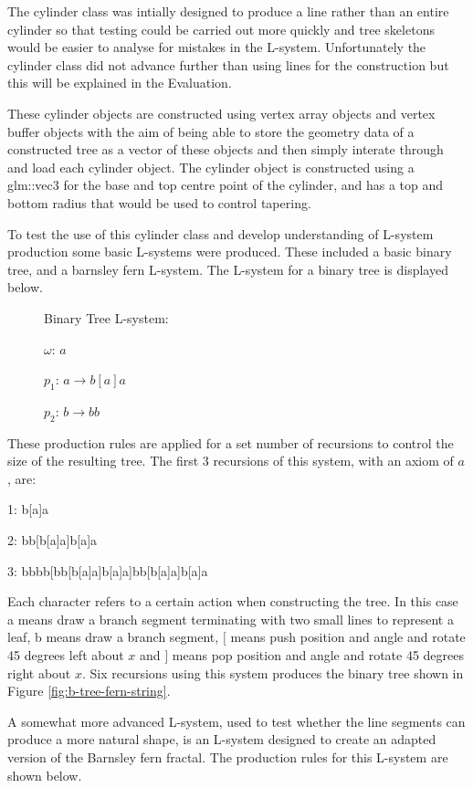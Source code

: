 \documentclass[final]{cmpreport}
\begin{document}
The cylinder class was intially designed to produce a line rather than an entire cylinder so that 
testing could be carried out more quickly and tree skeletons would be easier to analyse for 
mistakes in the L-system. Unfortunately the cylinder class did not advance further than using 
lines for the construction but this will be explained in the Evaluation. 

These cylinder objects are constructed using vertex array objects and vertex buffer objects with 
the aim of being able to store the geometry data of a constructed tree as a vector of these 
objects and then simply interate through and load each cylinder object. The cylinder object is 
constructed using a glm::vec3 for the base and top centre point of the cylinder, and has a top 
and bottom radius that would be used to control tapering. 

To test the use of this cylinder class and develop understanding of L-system production some 
basic L-systems were produced. These included a basic binary tree, and a barnsley fern L-system.
The L-system for a binary tree is displayed below.

\begin{figure}[ht]
    Binary Tree L-system:

    $\omega$: $a$ 

    $p_1$: $a \rightarrow b[a]a$

    $p_2$: $b \rightarrow bb$
    \label{fig:b-tree-string-system}
\end{figure}

These production rules are applied for a set number of recursions to control the size of the 
resulting tree. The first 3 recursions of this system, with an axiom of $a$, are:

1: b[a]a

2: bb[b[a]a]b[a]a

3: bbbb[bb[b[a]a]b[a]a]bb[b[a]a]b[a]a

Each character refers to a certain action when constructing the tree. In this case a means draw 
a branch segment terminating with two small lines to represent a leaf, b means draw a branch 
segment, $[$ means push position and angle and rotate 45 degrees left about $x$ and $]$ means 
pop position and angle and rotate 45 degrees right about $x$. Six recursions using this system 
produces the binary tree shown in Figure \ref{fig:b-tree-fern-string}.

A somewhat more advanced L-system, used to test whether the line segments can produce a more natural 
shape, is an L-system designed to create an adapted version of the Barnsley fern fractal. The 
production rules for this L-system are shown below.
\end{document}
